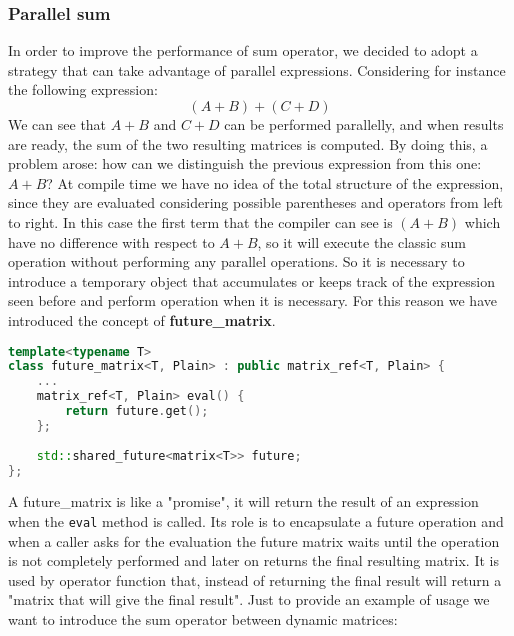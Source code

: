 \documentclass[11pt,a4paper]{article}
\begin{document}
\subsubsection{Parallel sum}
In order to improve the performance of sum operator, we decided to adopt a strategy that can take advantage of parallel expressions.
Considering for instance the following expression:
$$(A+B) + (C+D)$$
We can see that $A+B$ and $C+D$ can be performed parallelly, and when results are ready, the sum of the two resulting matrices is computed. By doing this, a problem arose: how can we distinguish the previous expression from this one: $A+B$? 
At compile time we have no idea of the total structure of the expression, since they are evaluated considering possible parentheses and operators from left to right. In this case the first term that the compiler can see is $(A+B)$ which have no difference with respect to $A+B$, so it will execute the classic sum operation without performing any parallel operations. So it is necessary to introduce a temporary object that accumulates or keeps track of the expression seen before and perform operation when it is necessary.
For this reason we have introduced the concept of \textbf{future\_matrix}.
\newpage
\begin{lstlisting}[language= C++]
template<typename T>
class future_matrix<T, Plain> : public matrix_ref<T, Plain> {
	...
	matrix_ref<T, Plain> eval() {
	    return future.get();
    }; 
    
	std::shared_future<matrix<T>> future;
};
\end{lstlisting}
A future\_matrix is like a "promise", it will return the result of an expression when the \verb|eval| method is called. Its role is to encapsulate a future operation and when a caller asks for the evaluation the future matrix waits until the operation is not completely performed and later on returns the final resulting matrix. It is used by operator function that, instead of returning the final result will return a "matrix that will give the final result".  Just to provide an example of usage we want to introduce the sum operator between dynamic matrices:
\end{document}
